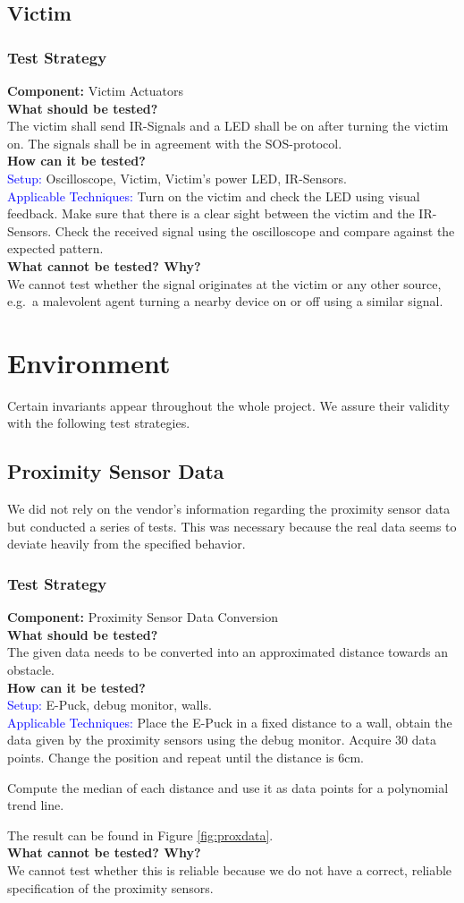 \documentclass[a4paper,parskip,headheight=38pt]{scrartcl} %
\newcommand{\teststrat}[5]{
    \subsubsection{Test Strategy}
	\textbf{Component:} #1 \\
	\noindent\textbf{What should be tested?} \\
    \noindent #2 \\
	\noindent\textbf{How can it be tested?} \\
    \noindent\textcolor{blue}{Setup:} #3 \\
    \noindent\textcolor{blue}{Applicable Techniques:} #4 \\
	\noindent\textbf{What cannot be tested? Why?} \\
    \noindent #5
}
\begin{document}
\subsection{Victim}

\teststrat{Victim Actuators}{
    The victim shall send IR-Signals and a LED shall be on after turning the
    victim on. The signals shall be in agreement with the SOS-protocol.
}{
    Oscilloscope, Victim, Victim's power LED, IR-Sensors.
}{
    Turn on the victim and check the LED using visual feedback. Make sure that
    there is a clear sight between the victim and the IR-Sensors. Check the
    received signal using the oscilloscope and compare against the expected
    pattern.
}{
    We cannot test whether the signal originates at the victim or any other
    source, e.g.\ a malevolent agent turning a nearby device on or off using a
    similar signal.
}

\section{Environment}

Certain invariants appear throughout the whole project. We assure their validity
with the following test strategies.

\subsection{Proximity Sensor Data}

We did not rely on the vendor's information regarding the proximity sensor data
but conducted a series of tests. This was necessary because the real data seems
to deviate heavily from the specified behavior.

\teststrat{Proximity Sensor Data Conversion}{
    The given data needs to be converted into an approximated distance towards
    an obstacle.
}{
    E-Puck, debug monitor, walls.
}{
    Place the E-Puck in a fixed distance to a wall, obtain the data given by
    the proximity sensors using the debug monitor. Acquire 30 data points.
    Change the position and repeat until the distance is 6cm.

    Compute the median of each distance and use it as data points for a
    polynomial trend line.

    The result can be found in Figure \ref{fig:proxdata}.
}{
    We cannot test whether this is reliable because we do not have a correct, 
    reliable specification of the proximity sensors.
}
\end{document}
